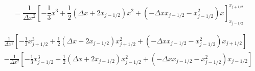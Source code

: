\documentclass[12pt]{article}
\begin{document}
\[ = \frac{1}{\Delta x^2} \left[- \frac{1}{3}x^3  + \frac{1}{2}(\Delta x + 2x_{j-1/2} ) x^2 + (-\Delta x x_{j-1/2} - x^2_{j-1/2})x  \right]_{x_{j-1/2}}^{x_{j+1/2}} \]

\begin{multline}
\frac{1}{\Delta x^2} \left[- \frac{1}{3}x_{j+1/2}^3  + \frac{1}{2}(\Delta x + 2x_{j-1/2} ) x_{j+1/2}^2 + (-\Delta x x_{j-1/2} - x^2_{j-1/2})x_{j+1/2}  \right]\\ - \frac{1}{\Delta x^2} \left[- \frac{1}{3}x_{j-1/2}^3  + \frac{1}{2}(\Delta x + 2x_{j-1/2} ) x_{j-1/2}^2 + (-\Delta x x_{j-1/2} - x^2_{j-1/2})x_{j-1/2} \right]
\end{multline}
\end{document}
